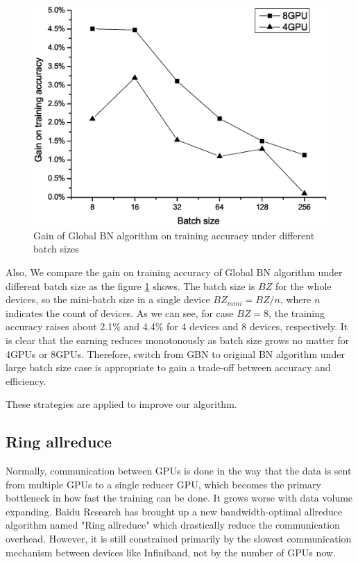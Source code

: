 \begin{figure}[!hbp]
    \centering
    \includegraphics[width=0.8\linewidth]{figure/accVsBz.eps}
    \caption{Gain of Global BN algorithm on training accuracy under different batch sizes}
    \label{fig:accVsBz}
    \end{figure}

Also, We compare the gain on training accuracy of Global BN algorithm under different batch size as the figure \ref{fig:accVsBz} shows. The batch size is $BZ$ for the whole devices, so the mini-batch size in a single device $BZ_{mini}=BZ/n$, where $n$ indicates the count of devices. 
As we can see, for case $BZ=8$, the training accuracy raises about 2.1$\%$ and 4.4$\%$ for 4 devices and 8 devices, respectively. It is clear that the earning reduces monotonously as batch size grows no matter for 4GPUs or 8GPUs. Therefore, switch from GBN to original BN algorithm under large batch size case is appropriate to gain a trade-off between accuracy and efficiency.





These strategies are applied to improve our algorithm.

\subsection{Ring allreduce}

Normally, communication between GPUs is done in the way that the data is sent from multiple GPUs to a single reducer GPU, which becomes the primary bottleneck in how fast the training can be done. It grows worse with data volume expanding. Baidu Research has brought up a new bandwidth-optimal allreduce algorithm named "Ring allreduce" which drastically reduce the communication overhead. However, it is still constrained primarily by the slowest communication mechanism between devices like Infiniband, not by the number of GPUs now.

